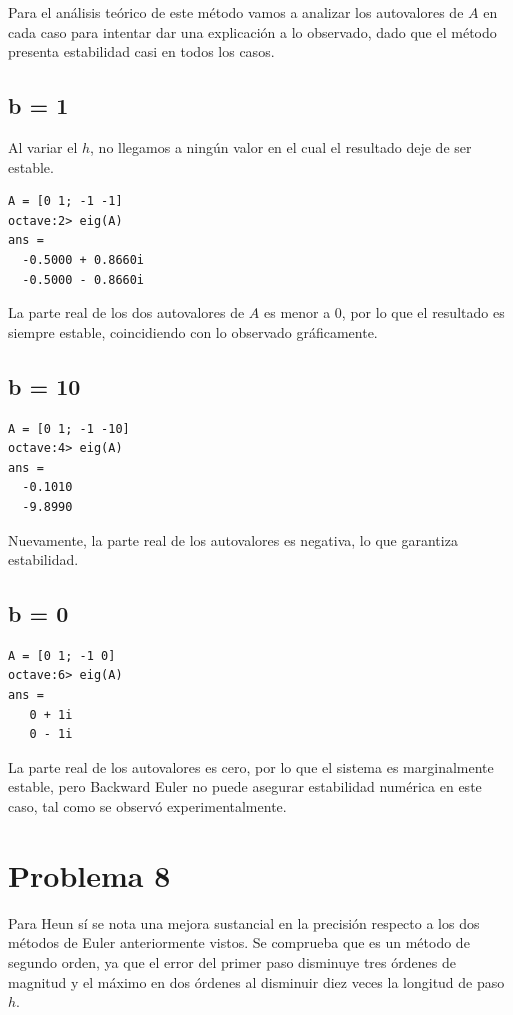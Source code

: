 \documentclass[a4paper,12pt]{article}
\begin{document}
Para el análisis teórico de este método vamos a analizar los autovalores de \( A \) en cada caso para intentar dar una explicación a lo observado, dado que el método presenta estabilidad casi en todos los casos.

\subsection*{b = 1}

Al variar el \( h \), no llegamos a ningún valor en el cual el resultado deje de ser estable.

\begin{verbatim}
A = [0 1; -1 -1]
octave:2> eig(A)
ans =
  -0.5000 + 0.8660i
  -0.5000 - 0.8660i
\end{verbatim}

La parte real de los dos autovalores de \( A \) es menor a 0, por lo que el resultado es siempre estable, coincidiendo con lo observado gráficamente.

\subsection*{b = 10}

\begin{verbatim}
A = [0 1; -1 -10]
octave:4> eig(A)
ans =
  -0.1010
  -9.8990
\end{verbatim}

Nuevamente, la parte real de los autovalores es negativa, lo que garantiza estabilidad.

\subsection*{b = 0}

\begin{verbatim}
A = [0 1; -1 0]
octave:6> eig(A)
ans =
   0 + 1i
   0 - 1i
\end{verbatim}

La parte real de los autovalores es cero, por lo que el sistema es marginalmente estable, pero Backward Euler no puede asegurar estabilidad numérica en este caso, tal como se observó experimentalmente.


\section*{Problema 8}

Para Heun sí se nota una mejora sustancial en la precisión respecto a los dos métodos de Euler anteriormente vistos. Se comprueba que es un método de segundo orden, ya que el error del primer paso disminuye tres órdenes de magnitud y el máximo en dos órdenes al disminuir diez veces la longitud de paso \( h \).
\end{document}
